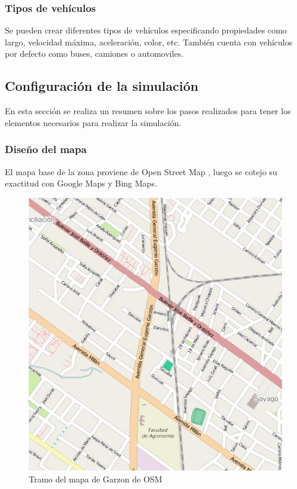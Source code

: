 \subsubsection{Tipos de vehículos}
Se pueden crear diferentes tipos de vehículos especificando propiedades como largo, velocidad máxima,  aceleración, color, etc. También cuenta con vehículos por defecto como buses, camiones o automoviles.







\subsection{Configuración de la simulación}

En esta sección se realiza un resumen sobre los pasos realizados para tener los elementos necesarios para realizar la simulación.

\subsubsection{Diseño del mapa}


El mapa base de la zona proviene de Open Street Map \citep{OSM}, luego se cotejo su exactitud con Google Maps y Bing Maps.

\begin{figure}[h]
\centering
\includegraphics[width=0.7\linewidth]{Figures/osm_garzon}
\caption{Tramo del mapa de Garzon de OSM}
\label{fig:osm_garzon}
\end{figure}



